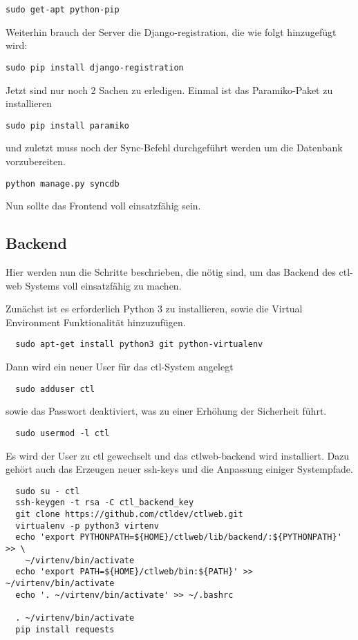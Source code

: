 \begin{lstlisting}
sudo get-apt python-pip
\end{lstlisting}
Weiterhin brauch der Server die Django-registration, die wie folgt hinzugefügt wird:
\begin{lstlisting}
sudo pip install django-registration
\end{lstlisting}
Jetzt sind nur noch 2 Sachen zu erledigen. Einmal ist das Paramiko-Paket zu installieren 
\begin{lstlisting}
sudo pip install paramiko
\end{lstlisting}
und zuletzt muss noch der Sync-Befehl durchgeführt werden um die Datenbank vorzubereiten.
\begin{lstlisting}
python manage.py syncdb
\end{lstlisting}
Nun sollte das Frontend voll einsatzfähig sein.
\subsection{Backend}
Hier werden nun die Schritte beschrieben, die nötig sind, um das Backend des
ctl-web Systems voll einsatzfähig zu machen.

Zunächst ist es erforderlich Python 3 zu installieren, sowie die Virtual
Environment Funktionalität hinzuzufügen.
\begin{lstlisting}
  sudo apt-get install python3 git python-virtualenv
\end{lstlisting}
Dann wird ein neuer User für das ctl-System angelegt
\begin{lstlisting}
  sudo adduser ctl
\end{lstlisting}
sowie das Passwort deaktiviert, was zu einer Erhöhung der Sicherheit führt.
\begin{lstlisting}
  sudo usermod -l ctl
\end{lstlisting}
Es wird der User zu ctl gewechselt und das ctlweb-backend wird installiert.
Dazu gehört auch das Erzeugen neuer ssh-keys und die Anpassung einiger
Systempfade.
\begin{lstlisting}
  sudo su - ctl
  ssh-keygen -t rsa -C ctl_backend_key
  git clone https://github.com/ctldev/ctlweb.git
  virtualenv -p python3 virtenv
  echo 'export PYTHONPATH=${HOME}/ctlweb/lib/backend/:${PYTHONPATH}' >> \
    ~/virtenv/bin/activate
  echo 'export PATH=${HOME}/ctlweb/bin:${PATH}' >> ~/virtenv/bin/activate
  echo '. ~/virtenv/bin/activate' >> ~/.bashrc

  . ~/virtenv/bin/activate
  pip install requests
\end{lstlisting}

